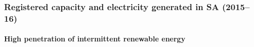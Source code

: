 \documentclass[handout, smaller, xcolor=table]{beamer}			%
\begin{document}
\begin{frame}
	\frametitle{\large Registered capacity and electricity generated in SA (2015--16)}
	\framesubtitle{High penetration of intermittent renewable energy}

\begin{figure}[!h]
	\begin{minipage}{0.50\linewidth}
		\centering
		\vspace{-5pt}
	\end{minipage}%
	\begin{minipage}{0.50\linewidth}
		\begin{table}[!h]
		\centering
		\label{tbl:sa_reg_cap_elec_gen}
\end{table}
\end{minipage}
\end{figure}
\end{frame}
\end{document}
